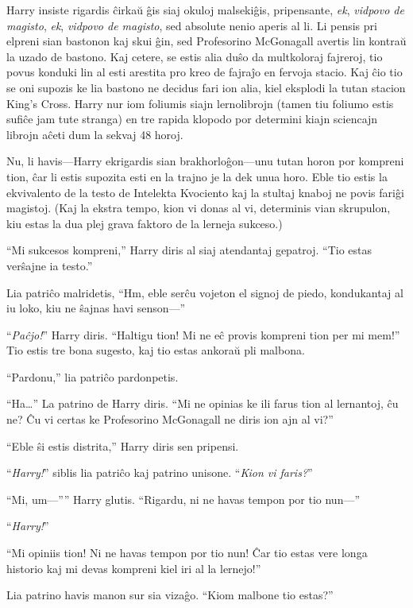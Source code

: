 Harry insiste rigardis ĉirkaŭ ĝis siaj okuloj malsekiĝis, pripensante,
\emph{ek}, \emph{vidpovo de magisto}, \emph{ek}, \emph{vidpovo de
  magisto}, sed absolute nenio aperis al li. Li pensis pri elpreni
sian bastonon kaj skui ĝin, sed Profesorino McGonagall avertis lin
kontraŭ la uzado de bastono. Kaj cetere, se estis alia duŝo da
multkoloraj fajreroj, tio povus konduki lin al esti arestita pro kreo
de fajraĵo en fervoja stacio. Kaj ĉio tio se oni supozis ke lia
bastono ne decidus fari ion alia, kiel eksplodi la tutan stacion
King's Cross.  Harry nur iom foliumis siajn lernolibrojn (tamen tiu
foliumo estis sufiĉe jam tute stranga) en tre rapida klopodo por
determini kiajn sciencajn librojn aĉeti dum la sekvaj 48 horoj.

Nu, li havis—Harry ekrigardis sian brakhorloĝon—unu tutan horon por
kompreni tion, ĉar li estis supozita esti en la trajno je la dek unua
horo. Eble tio estis la ekvivalento de la testo de Intelekta Kvociento
kaj la stultaj knaboj ne povis fariĝi magistoj. (Kaj la ekstra tempo,
kion vi donas al vi, determinis vian skrupulon, kiu estas la dua plej
grava faktoro de la lerneja sukceso.)

``Mi sukcesos kompreni,'' Harry diris al siaj atendantaj
gepatroj. ``Tio estas verŝajne ia testo.''

Lia patriĉo malridetis, ``Hm, eble serĉu vojeton el signoj de piedo,
kondukantaj al iu loko, kiu ne ŝajnas havi senson—''

``\emph{Paĉjo!}'' Harry diris. ``Haltigu tion! Mi ne eĉ provis
kompreni tion per mi mem!'' Tio estis tre bona sugesto, kaj tio estas
ankoraŭ pli malbona.

``Pardonu,'' lia patriĉo pardonpetis.

``Ha\ldots'' La patrino de Harry diris. ``Mi ne opinias ke ili farus
tion al lernantoj, ĉu ne? Ĉu vi certas ke Profesorino McGonagall ne diris
ion ajn al vi?''

``Eble ŝi estis distrita,'' Harry diris sen pripensi.

``\emph{Harry!}'' siblis lia patriĉo kaj patrino unisone. ``\emph{Kion
  vi faris?}''

``Mi, um—”'' Harry glutis. ``Rigardu, ni ne havas tempon por tio nun—''

``\emph{Harry!}''

``Mi opiniis tion! Ni ne havas tempon por tio nun! Ĉar tio estas vere
longa historio kaj mi devas kompreni kiel iri al la lernejo!''

Lia patrino havis manon sur sia vizaĝo. ``Kiom malbone tio estas?''


